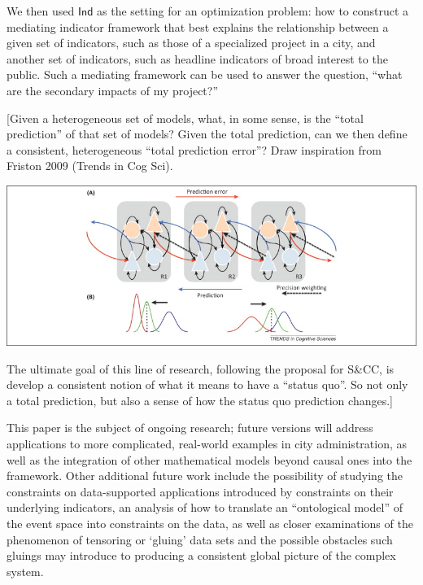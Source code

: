 \documentclass[sigconf]{acmart}
\newcommand{\redout}[1]{{\color{red}#1}}
\newcommand{\Cat}[1]{\mathsf{#1}}
\def\Ind{\Cat{Ind}}
\begin{document}
We then used $\Ind$ as the setting for an optimization problem: how to construct a mediating indicator framework that best explains the relationship between a given set of indicators, such as those of a specialized project in a city, and another set of indicators, such as headline indicators of broad interest to the public. Such a mediating framework can be used to answer the question, ``what are the secondary impacts of my project?''

\redout{[Given a heterogeneous set of models, what, in some sense, is the ``total prediction'' of that set of models? Given the total prediction, can we then define a consistent, heterogeneous ``total prediction error''? Draw inspiration from Friston 2009 (Trends in Cog Sci). 

\includegraphics[width=\linewidth]{anil_seth}

The ultimate goal of this line of research, following the proposal for S\&CC, is develop a consistent notion of what it means to have a ``status quo''. So not only a total prediction, but also a sense of how the status quo prediction changes.]
}

This paper is the subject of ongoing research; future versions will address applications to more complicated, real-world examples in city administration, as well as the integration of other mathematical models beyond causal ones into the framework. Other additional future work include the possibility of studying the constraints on data-supported applications introduced by constraints on their underlying indicators, an analysis of how to translate an ``ontological model'' of the event space into constraints on the data, as well as closer examinations of the phenomenon of tensoring or `gluing' data sets and the possible obstacles such gluings may introduce to producing a consistent global picture of the complex system.

\end{document}
